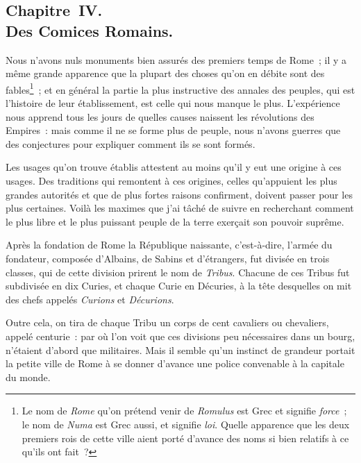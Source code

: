 \documentclass[french,twoside]{book} %
\begin{document}
\subsection[{Chapitre IV. Des Comices Romains.}]{Chapitre IV. \\
Des Comices Romains.}
\noindent Nous n’avons nuls monuments bien assurés des premiers temps de Rome ; il y a même grande apparence que la plupart des choses qu’on en débite sont des fables\footnote{Le nom de {\itshape Rome} qu’on prétend venir de {\itshape Romulus} est Grec et signifie {\itshape force} ; le nom de {\itshape Numa} est Grec aussi, et signifie {\itshape loi}. Quelle apparence que les deux premiers rois de cette ville aient porté d’avance des noms si bien relatifs à ce qu’ils ont fait ?} ; et en général la partie la plus instructive des annales des peuples, qui est l’histoire de leur établissement, est celle qui nous manque le plus. L’expérience nous apprend tous les jours de quelles causes naissent les révolutions des Empires : mais comme il ne se forme plus de peuple, nous n’avons guerres que des conjectures pour expliquer comment ils se sont formés.\par
Les usages qu’on trouve établis attestent au moins qu’il y eut une origine à ces usages. Des traditions qui remontent à ces origines, celles qu’appuient les plus grandes autorités et que de plus fortes raisons confirment, doivent passer pour les plus certaines. Voilà les maximes que j’ai tâché de suivre en recherchant comment le plus libre et le plus puissant peuple de la terre exerçait son pouvoir suprême.\par
Après la fondation de Rome la République naissante, c’est-à-dire, l’armée du fondateur, composée d’Albains, de Sabins et d’étrangers, fut divisée en trois classes, qui de cette division prirent le nom de {\itshape Tribus}. Chacune de ces Tribus fut subdivisée en dix Curies, et chaque Curie en Décuries, à la tête desquelles on mit des chefs appelés {\itshape Curions} et {\itshape Décurions}.\par
Outre cela, on tira de chaque Tribu un corps de cent cavaliers ou chevaliers, appelé centurie : par où l’on voit que ces divisions peu nécessaires dans un bourg, n’étaient d’abord que militaires. Mais il semble qu’un instinct de grandeur portait la petite ville de Rome à se donner d’avance une police convenable à la capitale du monde.\par
\end{document}
